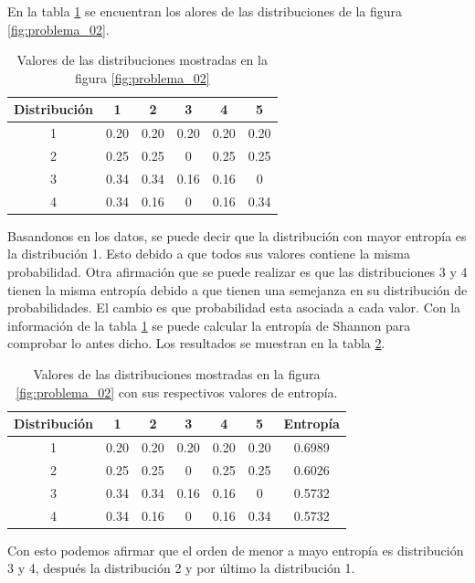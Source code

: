 En la tabla \ref{table:distributions} se encuentran los alores de las distribuciones de la figura \ref{fig:problema_02}.

\begin{table}[H]
    \centering
    \begin{tabular}{cccccc} \hline
        Distribución & 1    & 2    & 3    & 4    & 5    \\ \hline
        1            & 0.20 & 0.20 & 0.20 & 0.20 & 0.20 \\
        2            & 0.25 & 0.25 & 0    & 0.25 & 0.25 \\
        3            & 0.34 & 0.34 & 0.16 & 0.16 & 0    \\
        4            & 0.34 & 0.16 & 0    & 0.16 & 0.34 \\ \hline
    \end{tabular}
    \caption{Valores de las distribuciones mostradas en la figura \ref{fig:problema_02}}
    \label{table:distributions}
\end{table}

Basandonos en los datos, se puede decir que la distribución con mayor entropía es la distribución 1. Esto debido a que todos sus valores contiene la misma probabilidad. Otra afirmación que se puede realizar es que las distribuciones 3 y 4 tienen la misma entropía debido a que tienen una semejanza en su distribución de probabilidades. El cambio es que probabilidad esta asociada a cada valor. Con la información de la tabla \ref{table:distributions} se puede calcular la entropía de Shannon para comprobar lo antes dicho. Los resultados se muestran en la tabla \ref{table:distributions_2}.

\begin{table}[H]
    \centering
    \begin{tabular}{ccccccc} \hline
        Distribución & 1    & 2    & 3    & 4    & 5    & Entropía \\ \hline
        1            & 0.20 & 0.20 & 0.20 & 0.20 & 0.20 & 0.6989   \\
        2            & 0.25 & 0.25 & 0    & 0.25 & 0.25 & 0.6026   \\
        3            & 0.34 & 0.34 & 0.16 & 0.16 & 0    & 0.5732   \\
        4            & 0.34 & 0.16 & 0    & 0.16 & 0.34 & 0.5732   \\ \hline
    \end{tabular}
    \caption{Valores de las distribuciones mostradas en la figura \ref{fig:problema_02} con sus respectivos valores de entropía.}
    \label{table:distributions_2}
\end{table}

Con esto podemos afirmar que el orden de menor a mayo entropía es distribución 3 y 4, después la distribución 2 y por último la distribución 1.